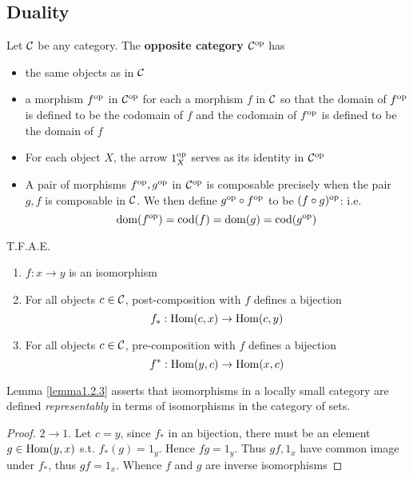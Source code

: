 \documentclass[11pt]{article}
\def \Cop {\calc^{\op}}
\def \fop {f^{\op}}
\def \gop {g^{\op}}
\begin{document}
\subsection{Duality}
\label{sec:org124d7b1}
\begin{definition}[]
Let \(\mathcal{C}\) be any category. The \textbf{opposite category} \(\mathcal{C}^{\operatorname{op}}\) has
\begin{itemize}
\item the same objects as in \(\mathcal{C}\)
\item a morphism \(\fop\) in \(\Cop\) for each a morphism \(f\) in \(\mathcal{C}\) so that the domain
of \(\fop\) is defined to be the codomain of \(f\) and the codomain of \(\fop\) is defined to
be the domain of \(f\)
\item For each object \(X\), the arrow \(1_X^{\operatorname{op}}\) serves as its identity in \(\Cop\)
\item A pair of morphisms \(\fop,\gop\) in \(\Cop\) is composable precisely when the pair \(g,f\) is
composable in \(\mathcal{C}\). We then define \(\gop\circ\fop\) to be \((f\circ g)^{\operatorname{op}}\): i.e.
\begin{equation*}
\dom(\fop)=\cod(f)=\dom(g)=\cod(\gop)
\end{equation*}
\end{itemize}
\end{definition}

\begin{lemma}[]
\label{lemma1.2.3}
T.F.A.E.
\begin{enumerate}
\item \(f:x\to y\) is an isomorphism
\item For all objects \(c\in\mathcal{C}\), post-composition with \(f\) defines a bijection
\begin{equation*}
f_*:\operatorname{Hom}(c,x)\to\operatorname{Hom}(c,y)
\end{equation*}
\item For all objects \(c\in\mathcal{C}\), pre-composition with \(f\) defines a bijection
\begin{equation*}
f^*:\operatorname{Hom}(y,c)\to\operatorname{Hom}(x,c)
\end{equation*}
\end{enumerate}
\end{lemma}

Lemma \ref{lemma1.2.3} asserts that isomorphisms in a locally small category are defined
\emph{representably} in terms of isomorphisms in the category of sets.

\begin{proof}
\(2\to 1\). Let \(c=y\), since \(f_*\) in an bijection, there must be an element \(g\in\operatorname{Hom}(y,x)\)
s.t. \(f_*(g)=1_y\). Hence \(fg=1_y\). Thus \(gf,1_x\) have common image under \(f_*\),
thus \(gf=1_x\). Whence \(f\) and \(g\) are inverse isomorphisms
\end{proof}
\end{document}
